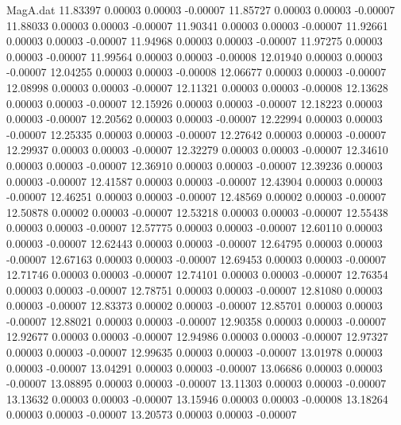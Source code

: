 \begin{filecontents}{MagA.dat}
  11.83397    0.00003    0.00003   -0.00007
  11.85727    0.00003    0.00003   -0.00007
  11.88033    0.00003    0.00003   -0.00007
  11.90341    0.00003    0.00003   -0.00007
  11.92661    0.00003    0.00003   -0.00007
  11.94968    0.00003    0.00003   -0.00007
  11.97275    0.00003    0.00003   -0.00007
  11.99564    0.00003    0.00003   -0.00008
  12.01940    0.00003    0.00003   -0.00007
  12.04255    0.00003    0.00003   -0.00008
  12.06677    0.00003    0.00003   -0.00007
  12.08998    0.00003    0.00003   -0.00007
  12.11321    0.00003    0.00003   -0.00008
  12.13628    0.00003    0.00003   -0.00007
  12.15926    0.00003    0.00003   -0.00007
  12.18223    0.00003    0.00003   -0.00007
  12.20562    0.00003    0.00003   -0.00007
  12.22994    0.00003    0.00003   -0.00007
  12.25335    0.00003    0.00003   -0.00007
  12.27642    0.00003    0.00003   -0.00007
  12.29937    0.00003    0.00003   -0.00007
  12.32279    0.00003    0.00003   -0.00007
  12.34610    0.00003    0.00003   -0.00007
  12.36910    0.00003    0.00003   -0.00007
  12.39236    0.00003    0.00003   -0.00007
  12.41587    0.00003    0.00003   -0.00007
  12.43904    0.00003    0.00003   -0.00007
  12.46251    0.00003    0.00003   -0.00007
  12.48569    0.00002    0.00003   -0.00007
  12.50878    0.00002    0.00003   -0.00007
  12.53218    0.00003    0.00003   -0.00007
  12.55438    0.00003    0.00003   -0.00007
  12.57775    0.00003    0.00003   -0.00007
  12.60110    0.00003    0.00003   -0.00007
  12.62443    0.00003    0.00003   -0.00007
  12.64795    0.00003    0.00003   -0.00007
  12.67163    0.00003    0.00003   -0.00007
  12.69453    0.00003    0.00003   -0.00007
  12.71746    0.00003    0.00003   -0.00007
  12.74101    0.00003    0.00003   -0.00007
  12.76354    0.00003    0.00003   -0.00007
  12.78751    0.00003    0.00003   -0.00007
  12.81080    0.00003    0.00003   -0.00007
  12.83373    0.00002    0.00003   -0.00007
  12.85701    0.00003    0.00003   -0.00007
  12.88021    0.00003    0.00003   -0.00007
  12.90358    0.00003    0.00003   -0.00007
  12.92677    0.00003    0.00003   -0.00007
  12.94986    0.00003    0.00003   -0.00007
  12.97327    0.00003    0.00003   -0.00007
  12.99635    0.00003    0.00003   -0.00007
  13.01978    0.00003    0.00003   -0.00007
  13.04291    0.00003    0.00003   -0.00007
  13.06686    0.00003    0.00003   -0.00007
  13.08895    0.00003    0.00003   -0.00007
  13.11303    0.00003    0.00003   -0.00007
  13.13632    0.00003    0.00003   -0.00007
  13.15946    0.00003    0.00003   -0.00008
  13.18264    0.00003    0.00003   -0.00007
  13.20573    0.00003    0.00003   -0.00007

\end{filecontents}
